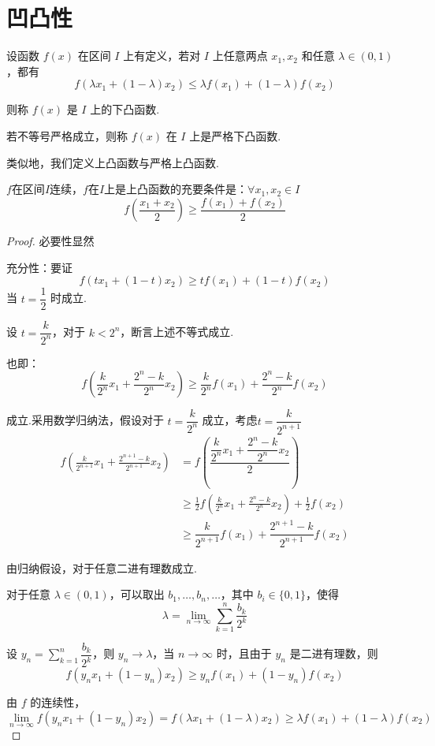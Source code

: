 \section{凹凸性}
\begin{definition}
	设函数 \( f(x) \) 在区间 \( I \) 上有定义，若对 \( I \) 上任意两点 \( x_1, x_2 \) 和任意 \( \lambda \in (0,1) \)，都有
	\[
	f(\lambda x_1 + (1 - \lambda)x_2) \leqslant \lambda f(x_1) + (1 - \lambda) f(x_2)
	\]
	
	则称 \( f(x) \) 是 \( I \) 上的下凸函数.
	
	若不等号严格成立，则称 \( f(x) \) 在 \( I \) 上是严格下凸函数.
	
	类似地，我们定义上凸函数与严格上凸函数.
\end{definition}
\begin{proposition}
	$f$在区间$I$连续，$f$在$I$上是上凸函数的充要条件是：$\forall x_1,x_2\in I$
	\[f(\frac{x_1+x_2}{2})\geqslant\frac{f(x_1)+f(x_2)}{2}\]
\end{proposition}
\begin{proof}
	必要性显然 
	
	充分性：要证
	\[
	f(tx_1 + (1-t)x_2) \geqslant tf(x_1) + (1-t)f(x_2)
	\]
	当 \( t = \dfrac{1}{2} \) 时成立.
	
	设 \( t = \dfrac{k}{2^n} \)，对于 \( k < 2^n \)，断言上述不等式成立.
	
	
	也即：
	\[
	f\left(\frac{k}{2^n}x_1 + \frac{2^n - k}{2^n}x_2\right) \geqslant \frac{k}{2^n}f(x_1) + \frac{2^n - k}{2^n}f(x_2)
	\]
	
	成立.采用数学归纳法，假设对于 \( t = \dfrac{k}{2^n} \) 成立，考虑$t=\dfrac{k}{2^{n+1}}$
	\[\begin{aligned}
		f\left(\frac{k}{2^{n+1}}x_1 + \frac{2^{n+1} - k}{2^{n+1}}x_2\right) &= f\left(\dfrac{\dfrac{k}{2^n}x_1+\dfrac{2^n-k}{2^n}x_2}{2}\right)\\
		&\geqslant \frac{1}{2}f\left(\frac{k}{2^n}x_1 + \frac{2^n - k}{2^n}x_2\right) + \frac{1}{2}f(x_2)\\
		&\geqslant \dfrac{k}{2^{n+1}}f(x_1)+\dfrac{2^{n+1}-k}{2^{n+1}}f(x_2)
	\end{aligned}\]
	
	由归纳假设，对于任意二进有理数成立.
	
	对于任意 \( \lambda \in (0,1) \)，可以取出 \( b_1, \ldots, b_n, \ldots \)，其中 \( b_i \in \{0,1\} \)，使得
	\[
	\lambda = \lim_{n \to \infty} \sum_{k=1}^n \frac{b_k}{2^k}
	\]
	
	设 \( y_n = \sum\limits_{k=1}^n \dfrac{b_k}{2^k} \)，则 \( y_n \to \lambda \)，当 \( n \to \infty \) 时，且由于 \( y_n \) 是二进有理数，则
	\[
	f(y_n x_1 + (1-y_n)x_2) \geqslant y_n f(x_1) + (1-y_n)f(x_2)
	\]
	
	由 \( f \) 的连续性，
	\[
	\lim_{n \to \infty} f(y_n x_1 + (1-y_n)x_2) = f(\lambda x_1 + (1-\lambda)x_2)\geqslant \lambda f(x_1) + (1-\lambda)f(x_2)
	\]
	
\end{proof}
